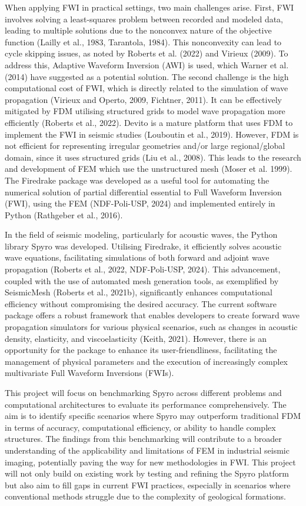 \documentclass[project-plan]{report-template}
\begin{document}
When applying FWI in practical settings, two main challenges arise. First, FWI involves solving a least-squares problem between recorded and modeled data, leading to multiple solutions due to the nonconvex nature of the objective function (Lailly et al., 1983, Tarantola, 1984). This nonconvexity can lead to cycle skipping issues, as noted by Roberts et al. (2022) and Virieux (2009). To address this, Adaptive Waveform Inversion (AWI) is used, which Warner et al. (2014) have suggested as a potential solution. The second challenge is the high computational cost of FWI, which is directly related to the simulation of wave propagation (Virieux and Operto, 2009, Fichtner, 2011). It can be effectively mitigated by FDM utilising structured grids to model wave propagation more efficiently (Roberts et al., 2022). Devito is a mature platform that uses FDM to implement the FWI in seismic studies (Louboutin et al., 2019). However, FDM is not efficient for representing irregular geometries and/or large regional/global domain, since it uses structured grids (Liu et al., 2008). This leads to the research and development of FEM which use the unstructured mesh (Moser et al. 1999). The Firedrake package was developed as a useful tool for automating the numerical solution of partial differential essential to Full Waveform Inversion (FWI), using the FEM (NDF-Poli-USP, 2024) and implemented entirely in Python (Rathgeber et al., 2016). 

In the field of seismic modeling, particularly for acoustic waves, the Python library Spyro was developed. Utilising Firedrake, it efficiently solves acoustic wave equations, facilitating simulations of both forward and adjoint wave propagation (Roberts et al., 2022, NDF-Poli-USP, 2024). This advancement, coupled with the use of automated mesh generation tools, as exemplified by SeismicMesh (Roberts et al., 2021b), significantly enhances computational efficiency without compromising the desired accuracy. The current software package offers a robust framework that enables developers to create forward wave propagation simulators for various physical scenarios, such as changes in acoustic density, elasticity, and viscoelasticity (Keith, 2021). However, there is an opportunity for the package to enhance its user-friendliness, facilitating the management of physical parameters and the execution of increasingly complex multivariate Full Waveform Inversions (FWIs).

This project will focus on benchmarking Spyro across different problems and computational architectures to evaluate its performance comprehensively. The aim is to identify specific scenarios where Spyro may outperform traditional FDM in terms of accuracy, computational efficiency, or ability to handle complex structures. The findings from this benchmarking will contribute to a broader understanding of the applicability and limitations of FEM in industrial seismic imaging, potentially paving the way for new methodologies in FWI. This project will not only build on existing work by testing and refining the Spyro platform but also aim to fill gaps in current FWI practices, especially in scenarios where conventional methods struggle due to the complexity of geological formations.
\end{document}
